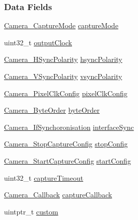 \subsubsection*{Data Fields}
\begin{DoxyCompactItemize}
\item 
\hyperlink{_camera_8h_a74c8a8a13eebddea16c33c726d096ba8}{Camera\+\_\+\+Capture\+Mode} \hyperlink{struct_camera___params_ab370847eb029c1b816830f6a2fb1956f}{capture\+Mode}
\item 
uint32\+\_\+t \hyperlink{struct_camera___params_a0b8e5d861228a67c891ac7737c3546af}{output\+Clock}
\item 
\hyperlink{_camera_8h_a44b110de33cc32adba6d4a5807665987}{Camera\+\_\+\+H\+Sync\+Polarity} \hyperlink{struct_camera___params_a08f9574d65f148d071452c4ae0841d4b}{hsync\+Polarity}
\item 
\hyperlink{_camera_8h_a05347818dd7d8986a24a0fe1bc74d412}{Camera\+\_\+\+V\+Sync\+Polarity} \hyperlink{struct_camera___params_a707b9746ec88eb4d183a7471fd8151bf}{vsync\+Polarity}
\item 
\hyperlink{_camera_8h_a081a0e4af0b04d76a5476d22e6cf8657}{Camera\+\_\+\+Pixel\+Clk\+Config} \hyperlink{struct_camera___params_a55279b026ec9bee61c7f3fedef456d64}{pixel\+Clk\+Config}
\item 
\hyperlink{_camera_8h_ae5c1282ca99dd27ba0faf0f16f6e9904}{Camera\+\_\+\+Byte\+Order} \hyperlink{struct_camera___params_ac23766c87406fdf6b9aca3a3b9b4e15c}{byte\+Order}
\item 
\hyperlink{_camera_8h_a741d469cc903899255a1d3e76fdce47b}{Camera\+\_\+\+If\+Synchoronisation} \hyperlink{struct_camera___params_ad32edd6c21bc9952deeb917034ca0f45}{interface\+Sync}
\item 
\hyperlink{_camera_8h_a783564f838bc718a5b56f114027f5185}{Camera\+\_\+\+Stop\+Capture\+Config} \hyperlink{struct_camera___params_a89b5c7168ff120da5fc7461fb71499aa}{stop\+Config}
\item 
\hyperlink{_camera_8h_a97037da7c87b817ddb71ec7100c69ca5}{Camera\+\_\+\+Start\+Capture\+Config} \hyperlink{struct_camera___params_aa754cc494ff462b01a7ed647742b15af}{start\+Config}
\item 
uint32\+\_\+t \hyperlink{struct_camera___params_a7a66a4013966579c58e2d02ad788d6ce}{capture\+Timeout}
\item 
\hyperlink{_camera_8h_ad70b3ced1706386d1a093a0bf659bd87}{Camera\+\_\+\+Callback} \hyperlink{struct_camera___params_a2bc1db1262e09919a7711301cd784fda}{capture\+Callback}
\item 
uintptr\+\_\+t \hyperlink{struct_camera___params_ab2f522ea8c1e8b656d01ebd110847b70}{custom}
\end{DoxyCompactItemize}


